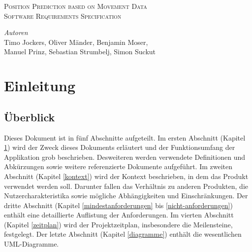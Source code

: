 \documentclass[12pt]{article} %
\begin{document}
\begin{titlepage}

\newcommand{\HRule}{\rule{\linewidth}{0.5mm}} %

\center %

\textsc{\Large Position Prediction based on Movement Data}\\[0.5cm] %
\textsc{\large Software Requirements Specification}\\[0.5cm] %

\vfill

\emph{Autoren}\\
Timo Jockers, Oliver Mänder, Benjamin Moser,\\Manuel Prinz, Sebastian Strumbelj, Simon Suckut

\vfill %

\end{titlepage}


\tableofcontents %

\newpage


\section{Einleitung} \label{einleitung}


\subsection{Überblick}

Dieses Dokument ist in fünf Abschnitte aufgeteilt. Im ersten Abschnitt (Kapitel \ref{einleitung}) wird der Zweck dieses Dokuments erläutert und der Funktionsumfang der Applikation grob beschrieben. Desweiteren werden verwendete Definitionen und Abkürzungen sowie weitere referenzierte Dokumente aufgeführt. Im zweiten Abschnitt (Kapitel \ref{kontext}) wird der Kontext beschrieben, in dem das Produkt verwendet werden soll. Darunter fallen das Verhältnis zu anderen Produkten, die Nutzercharakteristika sowie mögliche Abhängigkeiten und Einschränkungen.
Der dritte Abschnitt (Kapitel \ref{mindestanforderungen} bis \ref{nicht-anforderungen}) enthält eine detaillierte Auflistung der Anforderungen. Im vierten Abschnitt (Kapitel \ref{zeitplan}) wird der Projektzeitplan, insbesondere die Meilensteine, festgelegt. Der letzte Abschnitt (Kapitel \ref{diagramme}) enthält die wesentlichen UML-Diagramme.
\end{document}

